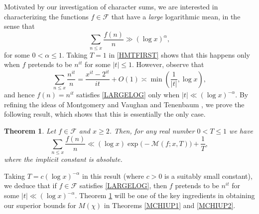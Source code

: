 \documentclass[12pt]{amsart}
\newtheorem{thm}{Theorem}[section]
\theoremstyle{definition}
\numberwithin{equation}{section}
\newcommand{\mc}{\mathcal}
\renewcommand{\bar}{\overline}
\begin{document}
Motivated by our investigation of character sums, we are interested in characterizing the functions $f\in \mc{F}$ that have a \emph{large} 
logarithmic mean, in the sense that
\begin{equation}\label{LARGELOG}
\sum_{n \leq x} \frac{f(n)}{n}\gg (\log x)^{\alpha},
\end{equation}
for some $0<\alpha\leq 1$.
Taking $T=1$ in \eqref{HMTFIRST} shows that this happens only when $f$ pretends to be $n^{it}$ for some $|t|\leq 1$. However, observe that
 $$\sum_{n \leq x} \frac{n^{it}}{n} = \frac{x^{it}-2^{it}}{it} +O(1)\asymp \min\left(\frac{1}{|t|}, \log x\right),$$
and hence $f(n)=n^{it}$ satisfies \eqref{LARGELOG} only when $|t|\ll (\log x)^{-\alpha}$. By refining the ideas of Montgomery and Vaughan \cite{MV} and Tenenbaum \cite{Te}, we prove the following result, which shows that this is essentially the only case.  
\begin{thm}\label{LogarithmicMean}
Let $f\in \mathcal{F}$ and $x\geq 2$. Then, for any real number $0< T \leq 1$ we have
$$\sum_{n\leq x}\frac{f(n)}{n}\ll  (\log x) \exp\big(-\mc{M}(f;x, T)\big)+\frac{1}{T},
$$
where the implicit constant is absolute.
\end{thm}
Taking $T=c(\log x)^{-\alpha}$ in this result (where $c>0$ is a suitably small constant), we deduce that if $f\in \mc{F}$ satisfies \eqref{LARGELOG}, then $f$ pretends to be $n^{it}$ for some $|t|\ll (\log x)^{-\alpha}$. Theorem \ref{LogarithmicMean} will be one of the key ingredients in obtaining our superior bounds for $M(\chi)$ in Theorems \ref{MCHIUP1} and \ref{MCHIUP2}.
\end{document}
